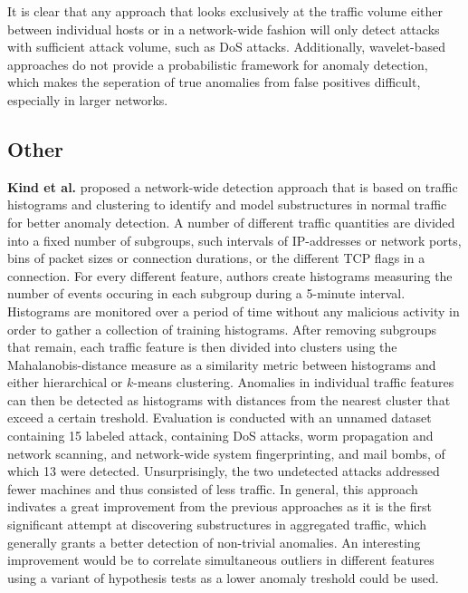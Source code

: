 \documentclass[a4paper,12pt,twoside]{report}
\begin{document}
It is clear that any approach that looks exclusively at the traffic volume either between individual hosts or in a network-wide fashion will only detect attacks with sufficient attack volume, such as DoS attacks. Additionally, wavelet-based approaches do not provide a probabilistic framework for anomaly detection, which makes the seperation of true anomalies from false positives difficult, especially in larger networks. 


\subsection{Other}



\textbf{Kind et al.} \cite{kind2009histogram} proposed a network-wide detection approach that is based on traffic histograms and clustering to identify and model substructures in normal traffic for better anomaly detection. A number of different traffic quantities are divided into a fixed number of subgroups, such intervals of IP-addresses or network ports, bins of packet sizes or connection durations, or the different TCP flags in a connection. For every different feature, authors create histograms measuring the number of events occuring in each subgroup during a 5-minute interval. Histograms are monitored over a period of time without any malicious activity in order to gather a collection of training histograms. After removing subgroups that remain, each traffic feature is then divided into clusters using the Mahalanobis-distance measure as a similarity metric between histograms and either hierarchical or $k$-means clustering. Anomalies in individual traffic features can then be detected as histograms with distances from the nearest cluster that exceed a certain treshold. Evaluation is conducted with an unnamed dataset containing 15 labeled attack, containing DoS attacks, worm propagation and network scanning, and network-wide system fingerprinting, and mail bombs, of which 13 were detected. Unsurprisingly, the two undetected attacks addressed fewer machines and thus consisted of less traffic. In general, this approach indivates a great improvement from the previous approaches as it is the first significant attempt at discovering substructures in aggregated traffic, which generally grants a better detection of non-trivial anomalies. An interesting improvement would be to correlate simultaneous outliers in different features using a variant of hypothesis tests as a lower anomaly treshold could be used.
\end{document}
